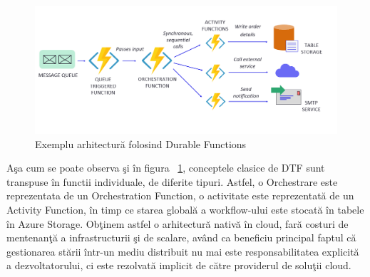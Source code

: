  \begin{figure}[h]
\begin{center}
        \includegraphics[width=1\textwidth]{images/durable-functions}
			 \caption{Exemplu arhitectură folosind Durable Functions}
			 \label{fig:durable-functions}
\end{center}
\end{figure}
\par Aşa cum se poate observa şi în figura ~\ref{fig:durable-functions}, conceptele clasice de DTF sunt transpuse în functii individuale, de diferite tipuri. Astfel, o Orchestrare este reprezentata de un Orchestration Function, o activitate este reprezentată de un Activity Function, în timp ce starea globală a workflow-ului este stocată în tabele în Azure Storage. Obţinem astfel o arhitectură nativă în cloud, fară costuri de mentenanţă a infrastructurii şi de scalare, având ca beneficiu principal faptul că gestionarea stării într-un mediu distribuit nu mai este responsabilitatea explicită a dezvoltatorului, ci este rezolvată implicit de către providerul de soluţii cloud. 
